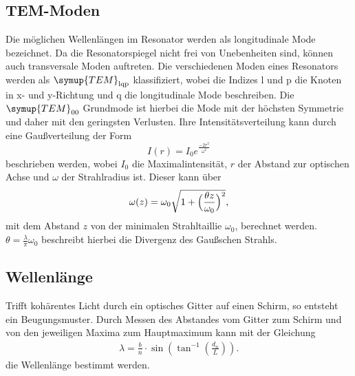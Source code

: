 \subsection{TEM-Moden}

Die möglichen Wellenlängen im Resonator werden als longitudinale Mode bezeichnet. Da die Resonatorspiegel nicht frei von Unebenheiten sind, können auch transversale
Moden auftreten. Die verschiedenen Moden eines Resonators werden als $\symup{TEM}_\text{lqp}$ klassifiziert, wobei die Indizes l und p die Knoten in x- und y-Richtung
und q die longitudinale Mode beschreiben. Die $\symup{TEM}_\text{00}$ Grundmode ist hierbei die Mode mit der höchsten Symmetrie und daher mit den geringsten Verlusten.
Ihre Intensitätsverteilung kann durch eine Gaußverteilung der Form
\begin{equation}
I(r)=I_0e^{\frac{-2r^2}{\omega^2}}
\end{equation}
beschrieben werden, wobei $I_0$ die Maximalintensität, $r$ der Abstand zur optischen Achse und $\omega$ der Strahlradius ist.
Dieser kann über
\begin{equation}
  \omega(z)=\omega_0\sqrt{1+\Bigl(\frac{\theta z}{\omega_0}\Bigr)^2},
\end{equation}
mit dem Abstand $z$ von der minimalen Strahltaillie $\omega_0$, berechnet werden.
$\theta=\frac{\lambda}{\pi}\omega_0$ beschreibt hierbei die Divergenz des Gaußschen Strahls.


\subsection{Wellenlänge}

Trifft kohärentes Licht durch ein optisches Gitter auf einen Schirm, so entsteht ein Beugungsmuster. Durch Messen des Abstandes vom Gitter zum Schirm und von den
jeweiligen Maxima zum Hauptmaximum kann mit der Gleichung
\begin{align}
    \lambda = \frac{b}{n}\cdot\sin\left(\tan^{-1}\left(\frac{d_n}{L}\right)\right).
\end{align}
\noindent
die Wellenlänge bestimmt werden.